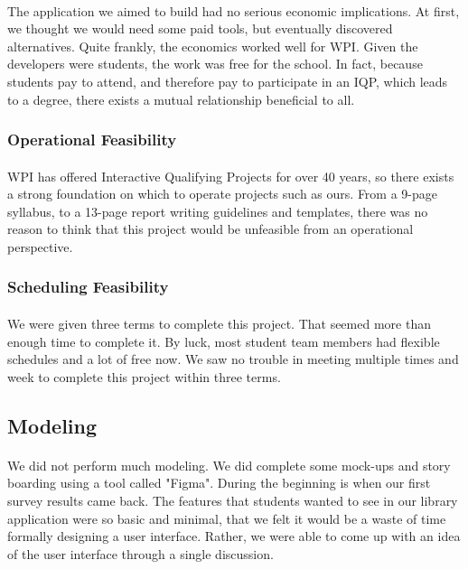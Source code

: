             \paragraph{}
            The application we aimed to build had no serious economic implications. At first, we thought we would need some paid tools, but eventually discovered alternatives. Quite frankly, the economics worked well for WPI. Given the developers were students, the work was free for the school. In fact, because students pay to attend, and therefore pay to participate in an IQP, which leads to a degree, there exists a mutual relationship beneficial to all.
            
        \subsubsection{Operational Feasibility}
        
            \paragraph{}
            WPI has offered Interactive Qualifying Projects for over 40 years, so there exists a strong foundation on which to operate projects such as ours. From a 9-page syllabus, to a 13-page report writing guidelines and templates, there was no reason to think that this project would be unfeasible from an operational perspective.
            
        \subsubsection{Scheduling Feasibility}
        
            \paragraph{}
            We were given three terms to complete this project. That seemed more than enough time to complete it. By luck, most student team members had flexible schedules and a lot of free now. We saw no trouble in meeting multiple times and week to complete this project within three terms.
    \newpage     
    \subsection{Modeling} %
    
        \paragraph{}
        We did not perform much modeling. We did complete some mock-ups and story boarding using a tool called "Figma". During the beginning is when our first survey results came back. The features that students wanted to see in our library application were so basic and minimal, that we felt it would be a waste of time formally designing a user interface. Rather, we were able to come up with an idea of the user interface through a single discussion.
    
